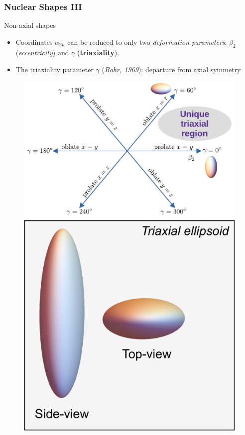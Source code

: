 \documentclass[
	11pt, %
]{beamer}
\begin{document}
\begin{frame}
	\frametitle{Nuclear Shapes III}
	\begin{alertblock}{Non-axial shapes}
		\begin{itemize}
			\item Coordinates $\alpha_{2\mu}$ can be reduced to only two \emph{deformation parameters}: $\beta_2$ (\emph{eccentricity}) and $\gamma$ (\textbf{triaxiality}).
			\item The triaxiality parameter $\gamma$ (\textit{Bohr, 1969}): departure from axial symmetry
		\end{itemize}
	\end{alertblock}
	
	\begin{figure}
		\centering
		\includegraphics[scale=0.42]{figures/nice_diagram.pdf}
		\includegraphics[scale=0.19]{figures/triaxial-shape.pdf}
	\end{figure}
\end{frame}
\end{document}

